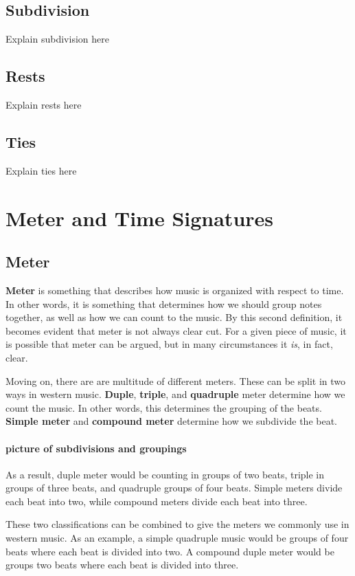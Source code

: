 \documentclass[../OpenAppliedMusicTheory.tex]{subfiles}
\begin{document}
        \subsection{Subdivision}
        Explain subdivision here

        \subsection{Rests}
        Explain rests here

        \subsection{Ties}
        Explain ties here
    
    \section{Meter and Time Signatures}\label{ch2:meter}
        \subsection{Meter}
        \textbf{Meter} is something that describes how music is organized with respect to time. In other words, it is something that determines how we should group notes together, as well as how we can count to the music. By this second definition, it becomes evident that meter is not always clear cut. For a given piece of music, it is possible that meter can be argued, but in many circumstances it \emph{is}, in fact, clear.

        Moving on, there are are multitude of different meters. These can be split in two ways in western music. \textbf{Duple}, \textbf{triple}, and \textbf{quadruple} meter determine how we count the music. In other words, this determines the grouping of the beats. \textbf{Simple meter} and \textbf{compound meter} determine how we subdivide the beat. 

        \paragraph{picture of subdivisions and groupings}As a result, duple meter would be counting in groups of two beats, triple in groups of three beats, and quadruple groups of four beats. Simple meters divide each beat into two, while compound meters divide each beat into three. 

        These two classifications can be combined to give the meters we commonly use in western music. As an example, a simple quadruple music would be groups of four beats where each beat is divided into two. A compound duple meter would be groups two beats where each beat is divided into three.
\end{document}
